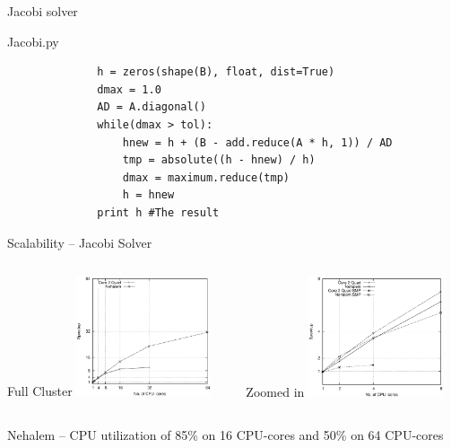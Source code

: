 \documentclass{beamer}
\begin{document}

\begin{frame}[fragile]{Jacobi solver}
\begin{center}
Jacobi.py
\end{center}
\begin{scriptsize}
\begin{verbatim}
              h = zeros(shape(B), float, dist=True)
              dmax = 1.0
              AD = A.diagonal()
              while(dmax > tol):
                  hnew = h + (B - add.reduce(A * h, 1)) / AD
                  tmp = absolute((h - hnew) / h)
                  dmax = maximum.reduce(tmp)
                  h = hnew
              print h #The result
\end{verbatim}
\end{scriptsize}
\end{frame}


\begin{frame}{Scalability -- Jacobi Solver}
\begin{scriptsize}
\begin{columns}
  \begin{column}{0.5\textwidth}
  \begin{center}
    \hspace{21px}Full Cluster
    \includegraphics[width=150px]{../gfx/JacobiStrong}
  \end{center}
  \end{column}
  \begin{column}{0.5\textwidth}
  \begin{center}
    \hspace{23px}Zoomed in
    \includegraphics[width=150px]{../gfx/JacobiStrongSMP}
  \end{center}
  \end{column}
\end{columns}
\begin{center}
Nehalem -- CPU utilization of 85\% on 16 CPU-cores and 50\% on 64 CPU-cores
\end{center}
\end{scriptsize}
\end{frame}
\end{document}
